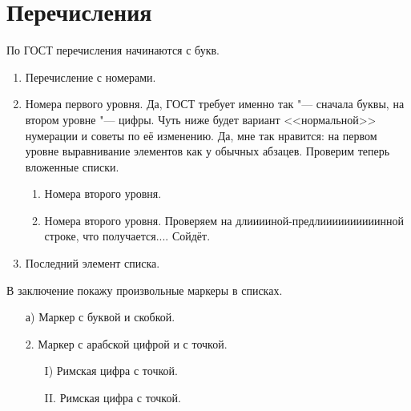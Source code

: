 \section{Перечисления}

По ГОСТ перечисления начинаются с букв.

\begin{enumerate}
    \item Перечисление с номерами.
    \item Номера первого уровня. Да, ГОСТ требует именно так "--- сначала буквы, на втором уровне "--- цифры.
    Чуть ниже будет вариант <<нормальной>> нумерации и советы по её изменению.
    Да, мне так нравится: на первом уровне выравнивание элементов как у обычных абзацев. Проверим теперь вложенные списки.
        \begin{enumerate}
            \item Номера второго уровня.
            \item Номера второго уровня. Проверяем на длииииной-предлиииииииииинной строке, что получается.... Сойдёт.
        \end{enumerate}
    \item Последний элемент списка.
\end{enumerate}

В заключение покажу произвольные маркеры в списках. 

\begin{enumerate}
    \item[а)] Маркер с буквой и скобкой.
    \item[2.] Маркер с арабской цифрой и с точкой.
        \begin{enumerate}
            \item[I)] Римская цифра с точкой.
            \item[II.] Римская цифра с точкой.
        \end{enumerate}
\end{enumerate}
